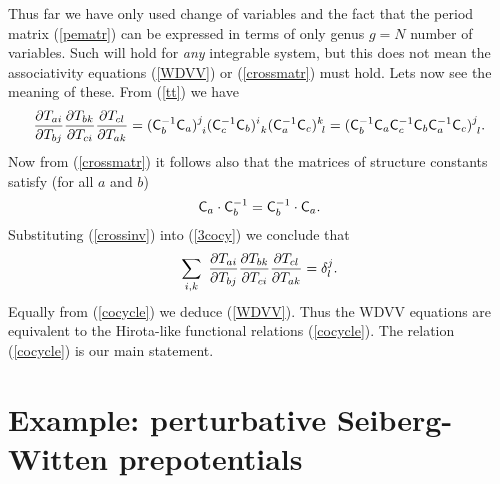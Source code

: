 \documentclass[a4paper,]{article}
\def\d{\partial}
\def\C{{\sf C}}
\begin{document}
Thus far we have only used change of variables and the fact that the
period matrix (\ref{pematr}) can be expressed in terms of only
genus $g=N$ number of variables.
Such will hold for {\em any} integrable system, but this does not mean 
the associativity equations (\ref{WDVV}) or (\ref{crossmatr}) must hold.
Lets now see the meaning of these. From (\ref{tt}) we have
\begin{equation}
\label{3cocy}
\dfrac{\d T_{ai}}{\d T_{bj}}\dfrac{\d T_{bk}}{\d T_{ci}}
\dfrac{\d T_{cl}}{\d T_{ak}}
= (\C_b\sp{-1} \C_a)\sp{j}_{\ i} (\C_c\sp{-1} \C_b)\sp{i} _{\ k}
(\C_a\sp{-1} \C_c)\sp{k} _{\ l}
=(\C_b\sp{-1} \C_a \C_c	\sp{-1} \C_b \C_a\sp{-1} \C_c)\sp{j} _{\ l}.
\end{equation}
Now from (\ref{crossmatr}) it follows also that 
the matrices of structure constants satisfy (for all $a$ and $b$)
\begin{equation}
\label{crossinv}
\C_a\cdot \C_b^{-1} = \C_b^{-1}\cdot \C_a.
\end{equation}
Substituting (\ref{crossinv}) into (\ref{3cocy}) we conclude that
\begin{equation}
\label{cocycle}
\sum_{i,k}\
\dfrac{\d T_{ai}}{\d T_{bj}}\dfrac{\d T_{bk}}{\d T_{ci}}
\dfrac{\d T_{cl}}{\d T_{ak}}
= \delta\sp{j} _l.
\end{equation}
Equally from (\ref{cocycle}) we deduce (\ref{WDVV}).
Thus the WDVV equations are equivalent to the Hirota-like functional 
relations (\ref{cocycle}).
The relation (\ref{cocycle}) is our main statement.


\section{Example: perturbative Seiberg-Witten prepotentials \label{ss:eg}}
\end{document}
